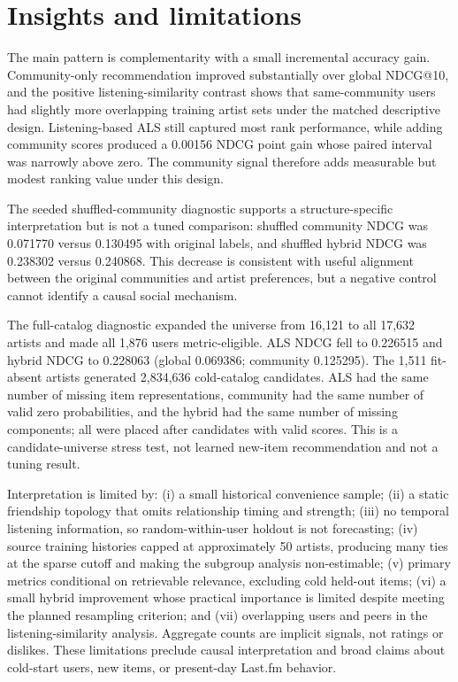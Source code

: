 \documentclass[10pt,a4paper]{article}
\begin{document}
\section{Insights and limitations}

The main pattern is complementarity with a small incremental accuracy gain. Community-only recommendation improved substantially over global NDCG@10, and the positive listening-similarity contrast shows that same-community users had slightly more overlapping training artist sets under the matched descriptive design. Listening-based ALS still captured most rank performance, while adding community scores produced a 0.00156 NDCG point gain whose paired interval was narrowly above zero. The community signal therefore adds measurable but modest ranking value under this design.

The seeded shuffled-community diagnostic supports a structure-specific interpretation but is not a tuned comparison: shuffled community NDCG was 0.071770 versus 0.130495 with original labels, and shuffled hybrid NDCG was 0.238302 versus 0.240868. This decrease is consistent with useful alignment between the original communities and artist preferences, but a negative control cannot identify a causal social mechanism.

The full-catalog diagnostic expanded the universe from 16,121 to all 17,632 artists and made all 1,876 users metric-eligible. ALS NDCG fell to 0.226515 and hybrid NDCG to 0.228063 (global 0.069386; community 0.125295). The 1,511 fit-absent artists generated 2,834,636 cold-catalog candidates. ALS had the same number of missing item representations, community had the same number of valid zero probabilities, and the hybrid had the same number of missing components; all were placed after candidates with valid scores. This is a candidate-universe stress test, not learned new-item recommendation and not a tuning result.

Interpretation is limited by: (i) a small historical convenience sample; (ii) a static friendship topology that omits relationship timing and strength; (iii) no temporal listening information, so random-within-user holdout is not forecasting; (iv) source training histories capped at approximately 50 artists, producing many ties at the sparse cutoff and making the subgroup analysis non-estimable; (v) primary metrics conditional on retrievable relevance, excluding cold held-out items; (vi) a small hybrid improvement whose practical importance is limited despite meeting the planned resampling criterion; and (vii) overlapping users and peers in the listening-similarity analysis. Aggregate counts are implicit signals, not ratings or dislikes. These limitations preclude causal interpretation and broad claims about cold-start users, new items, or present-day Last.fm behavior.
\end{document}
